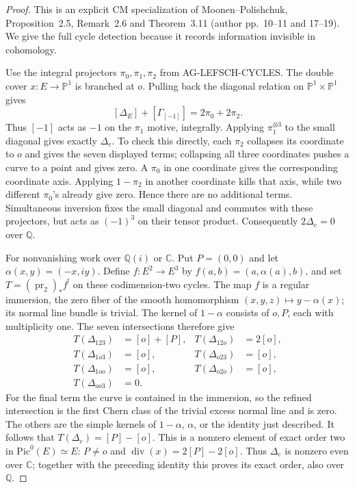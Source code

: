 \begin{proof}
This is an explicit CM specialization of Moonen--Polishchuk,
Proposition~2.5, Remark~2.6 and Theorem~3.11
(author pp.~10--11 and 17--19).  We give the full cycle
detection because it records information invisible in
cohomology.

Use the integral projectors $\pi_0,\pi_1,\pi_2$ from
AG-LEFSCH-CYCLES.  The double cover $x:E\to\mathbb P^1$
is branched at $o$.  Pulling back the diagonal relation
on $\mathbb P^1\times\mathbb P^1$ gives
\[
 [\Delta_E]+[\Gamma_{[-1]}]=2\pi_0+2\pi_2.
\]
Thus $[-1]$ acts as $-1$ on the $\pi_1$ motive, integrally.
Applying $\pi_1^{\otimes3}$ to the small diagonal gives
exactly $\Delta_e$.  To check this directly, each
$\pi_2$ collapses its coordinate to $o$ and gives the
seven displayed terms; collapsing all three coordinates
pushes a curve to a point and gives zero.  A $\pi_0$
in one coordinate gives the corresponding coordinate
axis.  Applying $1-\pi_2$ in another coordinate kills
that axis, while two different $\pi_0$'s already give
zero.  Hence there are no additional terms.
Simultaneous inversion fixes the small diagonal and
commutes with these projectors, but acts as $(-1)^3$
on their tensor product.  Consequently $2\Delta_e=0$
over $\mathbb Q$.

For nonvanishing work over $\mathbb Q(i)$ or $\mathbb C$.
Put $P=(0,0)$ and let $\alpha(x,y)=(-x,iy)$.
Define $f:E^2\to E^3$ by $f(a,b)=(a,\alpha(a),b)$,
and set $T=(\operatorname{pr}_2)_*f^!$ on these
codimension-two cycles.  The map $f$ is a regular
immersion, the zero fiber of the smooth homomorphism
$(x,y,z)\mapsto y-\alpha(x)$; its normal line bundle
is trivial.  The kernel of $1-\alpha$ consists of
$o,P$, each with multiplicity one.  The seven
intersections therefore give
\begin{align*}
 T(\Delta_{123})&=[o]+[P],&T(\Delta_{12o})&=2[o],\\
 T(\Delta_{1o3})&=[o],&T(\Delta_{o23})&=[o],\\
 T(\Delta_{1oo})&=[o],&T(\Delta_{o2o})&=[o],\\
 T(\Delta_{oo3})&=0.
\end{align*}
For the final term the curve is contained in the
immersion, so the refined intersection is the first
Chern class of the trivial excess normal line and
is zero.  The others are the simple kernels of
$1-\alpha$, $\alpha$, or the identity just described.
It follows that $T(\Delta_e)=[P]-[o]$.
This is a nonzero element of exact order two in
$\mathrm{Pic}^0(E)\simeq E$: $P\ne o$ and
$\operatorname{div}(x)=2[P]-2[o]$.
Thus $\Delta_e$ is nonzero even over $\mathbb C$;
together with the preceding identity this proves
its exact order, also over $\mathbb Q$.


\end{proof}
